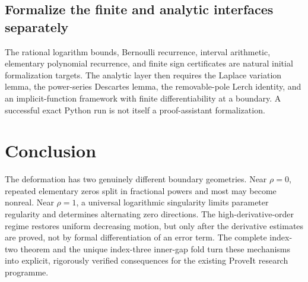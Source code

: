 \subsection{Formalize the finite and analytic interfaces separately}
The rational logarithm bounds, Bernoulli recurrence, interval arithmetic, elementary polynomial recurrence, and finite sign certificates are natural initial formalization targets. The analytic layer then requires the Laplace variation lemma, the power-series Descartes lemma, the removable-pole Lerch identity, and an implicit-function framework with finite differentiability at a boundary. A successful exact Python run is not itself a proof-assistant formalization.

\section*{Conclusion}
The deformation has two genuinely different boundary geometries. Near $\rho=0$, repeated elementary zeros split in fractional powers and most may become nonreal. Near $\rho=1$, a universal logarithmic singularity limits parameter regularity and determines alternating zero directions. The high-derivative-order regime restores uniform decreasing motion, but only after the derivative estimates are proved, not by formal differentiation of an error term. The complete index-two theorem and the unique index-three inner-gap fold turn these mechanisms into explicit, rigorously verified consequences for the existing ProveIt research programme.

